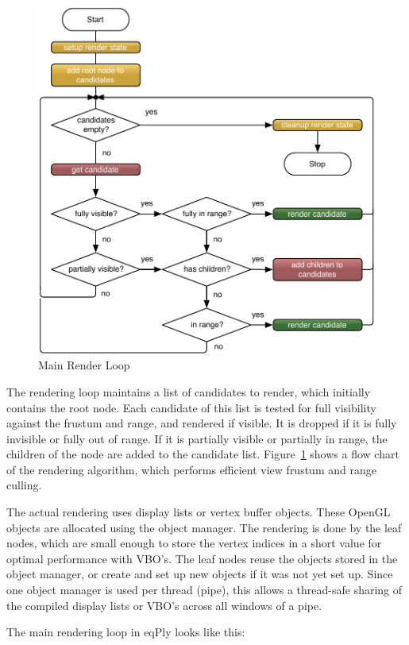 \documentclass[10pt,a4]{scrartcl}
\newcommand{\fig}[1]{Figure~\ref{#1}}
\begin{document}
\begin{figure}[h!t]\center
  \includegraphics[width=.618\textwidth]{images/render.pdf}
  {\caption{\label{fRender}Main Render Loop}}
\end{figure}
The rendering loop maintains a list of candidates to render, which
initially contains the root node. Each candidate of this list is tested
for full visibility against the frustum and range, and rendered if
visible. It is dropped if it is fully invisible or fully out of
range. If it is partially visible or partially in range, the children of
the node are added to the candidate list. \fig{fRender} shows a flow
chart of the rendering algorithm, which performs efficient view frustum
and range culling.

The actual rendering uses display lists or vertex buffer objects. These
OpenGL objects are allocated using the object manager. The rendering is
done by the leaf nodes, which are small enough to store the vertex
indices in a \textsf{short} value for optimal performance with VBO's.
The leaf nodes reuse the objects stored in the object manager, or create
and set up new objects if it was not yet set up. Since one object
manager is used per thread (pipe), this allows a thread-safe sharing of
the compiled display lists or VBO's across all windows of a pipe.

The main rendering loop in \textsf{eqPly} looks like this:
\end{document}
